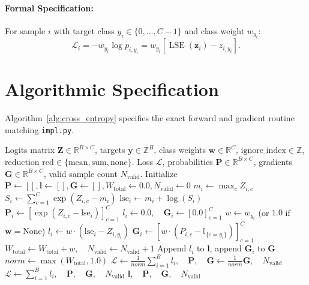 \documentclass[11pt]{article}
\begin{document}
\paragraph{Formal Specification:}
For sample $i$ with target class $y_i \in \{0, \dots, C-1\}$ and class weight $w_{y_i}$:
\begin{equation}
\label{eq:nll_def}
\mathcal{L}_i = -w_{y_i} \log p_{i, y_i} = w_{y_i} \left[ \operatorname{LSE}(\mathbf{z}_i) - z_{i, y_i} \right].
\end{equation}

\section{Algorithmic Specification}
\label{sec:algorithm}

Algorithm~\ref{alg:cross_entropy} specifies the exact forward and gradient routine matching \texttt{impl.py}.

\begin{algorithm}[H]
\caption{Multiclass Cross-Entropy Forward and Analytic Gradient Evaluation}
\label{alg:cross_entropy}
\begin{algorithmic}[1]
\Require Logits matrix $\mathbf{Z} \in \mathbb{R}^{B \times C}$, targets $\mathbf{y} \in \mathbb{Z}^B$, class weights $\mathbf{w} \in \mathbb{R}^C$, $\mathrm{ignore\_index} \in \mathbb{Z}$, reduction $\mathrm{red} \in \{\text{mean}, \text{sum}, \text{none}\}$.
\Ensure Loss $\mathcal{L}$, probabilities $\mathbf{P} \in \mathbb{R}^{B \times C}$, gradients $\mathbf{G} \in \mathbb{R}^{B \times C}$, valid sample count $N_{\mathrm{valid}}$.
\State Initialize $\mathbf{P} \gets [], \mathbf{l} \gets [], \mathbf{G} \gets [], W_{\mathrm{total}} \gets 0.0, N_{\mathrm{valid}} \gets 0$
    \State $m_i \gets \max_{c} Z_{i, c}$
    \State $S_i \gets \sum_{c=1}^C \exp(Z_{i, c} - m_i)$
    \State $\mathrm{lse}_i \gets m_i + \log(S_i)$
    \State $\mathbf{P}_i \gets [\exp(Z_{i, c} - \mathrm{lse}_i)]_{c=1}^C$
        \State $l_i \gets 0.0, \quad \mathbf{G}_i \gets [0.0]_{c=1}^C$
    \Else
        \State $w \gets w_{y_i}$ (or $1.0$ if $\mathbf{w} = \text{None}$)
        \State $l_i \gets w \cdot (\mathrm{lse}_i - Z_{i, y_i})$
        \State $\mathbf{G}_i \gets [w \cdot (P_{i, c} - \mathbb{I}_{\{c = y_i\}})]_{c=1}^C$
        \State $W_{\mathrm{total}} \gets W_{\mathrm{total}} + w, \quad N_{\mathrm{valid}} \gets N_{\mathrm{valid}} + 1$
    \EndIf
    \State Append $l_i$ to $\mathbf{l}$, append $\mathbf{G}_i$ to $\mathbf{G}$
\EndFor
{}
    \State $norm \gets \max(W_{\mathrm{total}}, 1.0)$
    \State \Return $\mathcal{L} \gets \frac{1}{norm}\sum_{i=1}^B l_i, \quad \mathbf{P}, \quad \mathbf{G} \gets \frac{1}{norm}\mathbf{G}, \quad N_{\mathrm{valid}}$
    \State \Return $\mathcal{L} \gets \sum_{i=1}^B l_i, \quad \mathbf{P}, \quad \mathbf{G}, \quad N_{\mathrm{valid}}$
\Else
    \State \Return $\mathbf{l}, \quad \mathbf{P}, \quad \mathbf{G}, \quad N_{\mathrm{valid}}$
\EndIf
\end{algorithmic}
\end{algorithm}
\end{document}
